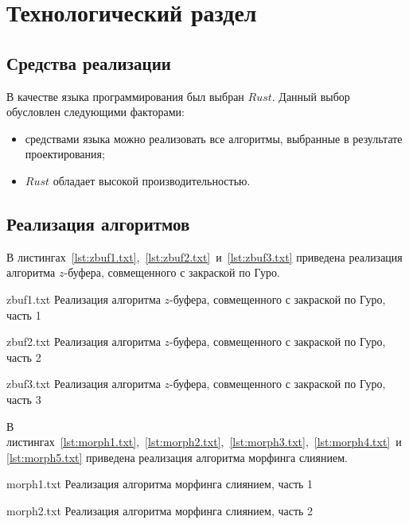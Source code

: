 \chapter{Технологический раздел}

\section{Средства реализации}

В качестве языка программирования был выбран $Rust$. Данный выбор обусловлен следующими факторами:

\begin{itemize}[label*=---]
	\item средствами языка можно реализовать все алгоритмы, выбранные в результате проектирования;
	\item $Rust$ обладает высокой производительностью. \cite{RUST_IS_THE_BEST}
\end{itemize}


\section{Реализация алгоритмов}

В листингах~\ref{lst:zbuf1.txt},~\ref{lst:zbuf2.txt}~и~\ref{lst:zbuf3.txt} приведена реализация алгоритма $z$-буфера, совмещенного с закраской по Гуро. 

{zbuf1.txt}
{Реализация алгоритма $z$-буфера, совмещенного с закраской по Гуро, часть 1}

\clearpage

{zbuf2.txt}
{Реализация алгоритма $z$-буфера, совмещенного с закраской по Гуро, часть 2}

\clearpage

{zbuf3.txt}
{Реализация алгоритма $z$-буфера, совмещенного с закраской по Гуро, часть 3}

\clearpage

В листингах~\ref{lst:morph1.txt},~\ref{lst:morph2.txt},~\ref{lst:morph3.txt},~\ref{lst:morph4.txt}~и~\ref{lst:morph5.txt} приведена реализация алгоритма морфинга слиянием. 

{morph1.txt}
{Реализация алгоритма морфинга слиянием, часть 1}

\clearpage

{morph2.txt}
{Реализация алгоритма морфинга слиянием, часть 2}

